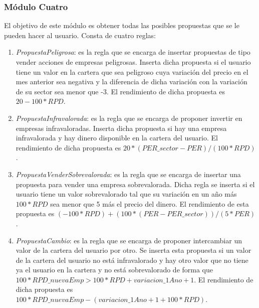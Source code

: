 \documentclass[12pt]{article}
\begin{document}
\subsubsection{Módulo Cuatro}
El objetivo de este módulo es obtener todas las posibles propuestas que se le pueden hacer al usuario. Consta de cuatro reglas:
\begin{enumerate}
\item \textit{PropuestaPeligrosa}: es la regla que se encarga de insertar propuestas de tipo vender acciones de empresas peligrosas. Inserta dicha propuesta si el usuario tiene un valor en la cartera que sea peligroso cuya variación del precio en el mes anterior sea negativa y la diferencia de dicha variación con la variación de su sector sea menor que -3. El rendimiento de dicha propuesta es $20 - 100*RPD$.
\item \textit{PropuestaInfravalorada}: es la regla que se encarga de proponer invertir en empresas infravaloradas. Inserta dicha propuesta si hay una empresa infravalorada y hay dinero disponible en la cartera del usuario. El rendimiento de dicha propuesta es $20*(PER\_sector - PER) / (100*RPD)$.
\item \textit{PropuestaVenderSobrevalorada}: es la regla que se encarga de insertar una propuesta para vender una empresa sobrevalorada. Dicha regla se inserta si el usuario tiene un valor sobrevalorado tal que su variación en un año más $100*RPD$ sea menor que 5 más el precio del dinero. El rendimiento de esta propuesta es $(-100*RPD)+(100*(PER - PER\_sector))/(5*PER)$.
\item \textit{PropuestaCambio}: es la regla que se encarga de proponer intercambiar un valor de la cartera del usuario por otro. Se inserta esta propuesta si un valor de la cartera del usuario no está infravalorado y hay otro valor que no tiene ya el usuario en la cartera y no está sobrevalorado de forma que $100*RPD\_nuevaEmp > 100*RPD + variacion\_1Ano + 1$. El rendimiento de dicha propuesta es $100*RPD\_nuevaEmp - (variacion\_1Ano + 1 + 100*RPD)$.
\end{enumerate}
\end{document}
